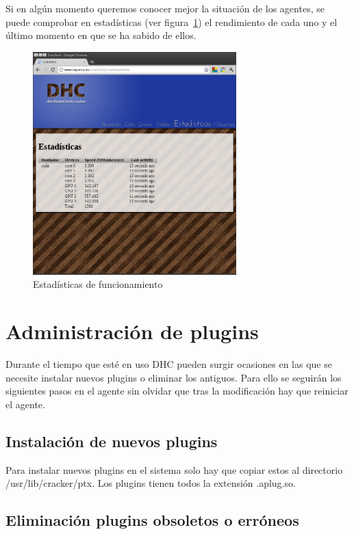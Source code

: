 Si en algún momento queremos conocer mejor la situación de los agentes, se puede comprobar en estadísticas (ver figura~\ref{fig:DHC_estadisticas}) el rendimiento de cada uno y el último momento en que se ha sabido de ellos.

\begin{figure}
	\centering
	\includegraphics[width=0.7\textwidth]{images/estadisticas.png}
	\caption{Estadísticas de funcionamiento}\label{fig:DHC_estadisticas}
\end{figure}

\section{Administración de plugins}

Durante el tiempo que esté en uso DHC pueden surgir ocasiones en las que se necesite instalar nuevos plugins o eliminar los antiguos.  Para ello se seguirán los siguientes pasos en el agente sin olvidar que tras la modificación hay que reiniciar el agente.

\subsection{Instalación de nuevos plugins}

Para instalar nuevos plugins en el sistema solo hay que copiar estos al directorio /usr/lib/cracker/ptx. Los plugins tienen todos la extensión .aplug.so.

\subsection{Eliminación plugins obsoletos o erróneos}

